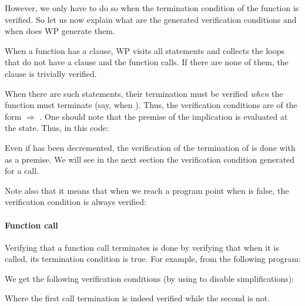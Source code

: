 However, we only have to do so when the termination condition of the function
is verified. So let us now explain what are the generated verification
conditions and when does WP generate them.


When a function has a  clause, WP visits all statements
and collects the loops that do not have a  clause and
the function calls. If there are none of them, the 
clause is trivially verified.




When there are such statements, their termination must be verified {\em when}
the function must terminate (say, when ). Thus, the verification
conditions are of the form
 $\Rightarrow$ .
One should note that the premise of the implication is evaluated at the
 state. Thus, in this code:




Even if  has been decremented, the verification of the
termination of  is done with
 as a premise. We will see in the
next section the verification condition generated for a call.


Note also that it means that when we reach a program point when 
is false, the verification condition is always verified:




\paragraph{Function call}


Verifying that a function call terminates is done by verifying that when it is
called, its termination condition is true. For example, from the following
program:




We get the following verification conditions (by using 
to disable simplifications):






Where the first call termination is indeed verified while the second is not.


